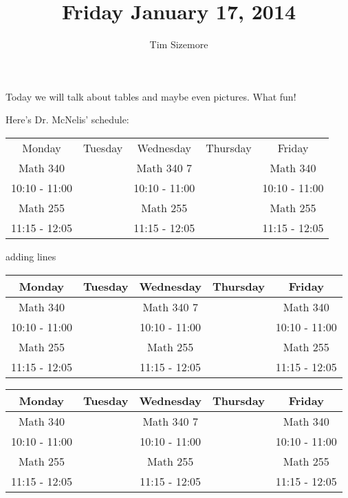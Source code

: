 \documentclass{article}
\begin{document}
\title{Friday January 17, 2014}
\author{Tim Sizemore}

\maketitle
Today we will talk about tables and maybe even pictures. What fun!

Here's Dr. McNelis' schedule:


\begin{tabular}{ccccc}
Monday        & Tuesday & Wednesday     & Thursday & Friday \\
Math 340      &         & Math 340 7    &          & Math 340 \\
10:10 - 11:00 &         & 10:10 - 11:00 &          & 10:10 - 11:00 \\
Math 255      &         & Math 255      &          & Math 255 \\
11:15 - 12:05 &         & 11:15 - 12:05 &          & 11:15 - 12:05 \\
\end{tabular}
adding lines \\

\begin{center}
\begin{tabular}{c|c|c|c|c}
Monday        & Tuesday & Wednesday     & Thursday & Friday \\
\hline
Math 340      &         & Math 340 7    &          & Math 340 \\
10:10 - 11:00 &         & 10:10 - 11:00 &          & 10:10 - 11:00 \\
\hline
Math 255      &         & Math 255      &          & Math 255 \\
11:15 - 12:05 &         & 11:15 - 12:05 &          & 11:15 - 12:05 \\
\end{tabular}
\end{center}

\begin{center}
\begin{tabular}{c|c|c|c|c}
Monday        & Tuesday & Wednesday     & Thursday & Friday \\
\hline
Math 340      &         & Math 340 7    &          & Math 340 \\
10:10 - 11:00 &         & 10:10 - 11:00 &          & 10:10 - 11:00 \\
\cline{1-1} \cline{3-5}
Math 255      &         & Math 255      &          & Math 255 \\
11:15 - 12:05 &         & 11:15 - 12:05 &          & 11:15 - 12:05 \\
\end{tabular}
\end{center}
\end{document}
